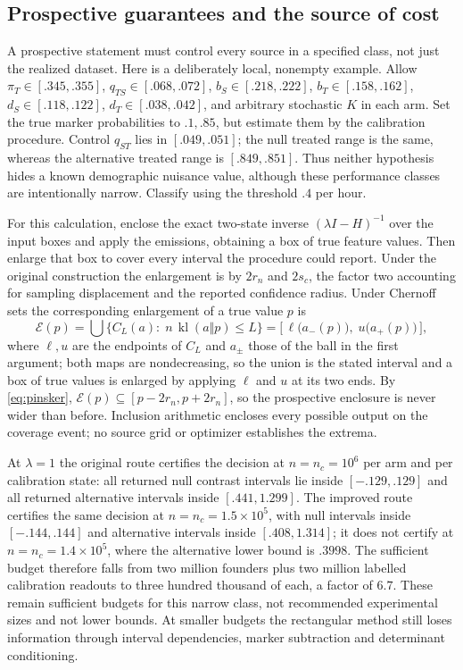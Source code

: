 \documentclass[11pt]{article}
\theoremstyle{definition}
\newcommand{\kl}{\operatorname{kl}}
\begin{document}
\subsection{Prospective guarantees and the source of cost}
A prospective statement must control every source in a specified class, not just
the realized dataset. Here is a deliberately local, nonempty example. Allow
$\pi_T\in[.345,.355]$, $q_{TS}\in[.068,.072]$, $b_S\in[.218,.222]$,
$b_T\in[.158,.162]$, $d_S\in[.118,.122]$, $d_T\in[.038,.042]$, and arbitrary
stochastic $K$ in each arm. Set the true marker probabilities to $.1,.85$, but
estimate them by the calibration procedure. Control $q_{ST}$ lies in
$[.049,.051]$; the null treated range is the same, whereas the alternative
treated range is $[.849,.851]$. Thus neither hypothesis hides a known
demographic nuisance value, although these performance classes are intentionally
narrow. Classify using the threshold $.4$ per hour.

For this calculation, enclose the exact two-state inverse $(\lambda I-H)^{-1}$
over the input boxes and apply the emissions, obtaining a box of true feature
values. Then enlarge that box to cover every interval the procedure could
report. Under the original construction the enlargement is by $2r_n$ and $2s_c$,
the factor two accounting for sampling displacement and the reported confidence
radius. Under Chernoff sets the corresponding enlargement of a true value $p$ is
\begin{equation}\label{eq:double}
 \mathcal E(p)=\bigcup\{C_L(a):\;n\,\kl(a\Vert p)\le L\}
   =\bigl[\,\ell\bigl(a_-(p)\bigr),\;u\bigl(a_+(p)\bigr)\,\bigr],
\end{equation}
where $\ell,u$ are the endpoints of $C_L$ and $a_\pm$ those of the ball in the
first argument; both maps are nondecreasing, so the union is the stated
interval and a box of true values is enlarged by applying $\ell$ and $u$ at its
two ends. By \eqref{eq:pinsker}, $\mathcal E(p)\subseteq[p-2r_n,p+2r_n]$, so the
prospective enclosure is never wider than before. Inclusion arithmetic encloses
every possible output on the coverage event; no source grid or optimizer
establishes the extrema.

At $\lambda=1$ the original route certifies the decision at
$n=n_c=10^{6}$ per arm and per calibration state: all returned null contrast
intervals lie inside $[-.129,.129]$ and all returned alternative intervals
inside $[.441,1.299]$. The improved route certifies the same decision at
$n=n_c=1.5\times10^{5}$, with null intervals inside $[-.144,.144]$ and
alternative intervals inside $[.408,1.314]$; it does not certify at
$n=n_c=1.4\times10^{5}$, where the alternative lower bound is $.3998$. The
sufficient budget therefore falls from two million founders plus two million
labelled calibration readouts to three hundred thousand of each, a factor of
$6.7$. These remain sufficient budgets for this narrow class, not recommended
experimental sizes and not lower bounds. At smaller budgets the rectangular
method still loses information through interval dependencies, marker subtraction
and determinant conditioning.
\end{document}
